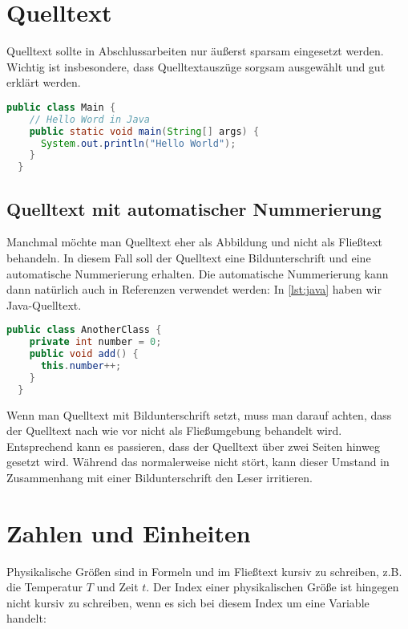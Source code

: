 \section{Quelltext}

Quelltext sollte in Abschlussarbeiten nur äußerst sparsam eingesetzt werden. Wichtig ist insbesondere, dass Quelltextauszüge sorgsam ausgewählt und gut erklärt werden.

\begin{lstlisting}[language=Java,gobble=2]
  public class Main {
    // Hello Word in Java
    public static void main(String[] args) {
      System.out.println("Hello World");
    }
  }
\end{lstlisting}

\subsection{Quelltext mit automatischer Nummerierung}

Manchmal möchte man Quelltext eher als Abbildung und nicht als Fließtext behandeln. In diesem Fall soll der Quelltext eine Bildunterschrift und eine automatische Nummerierung erhalten. Die automatische Nummerierung kann dann natürlich auch in Referenzen verwendet werden: In \vref{lst:java} haben wir Java-Quelltext.

\begin{lstlisting}[language=Java,gobble=2,caption={Ich bin die Bildunterschrift des Quelltextes},label=lst:java]
  public class AnotherClass {
    private int number = 0;
    public void add() {
      this.number++;
    }
  }
\end{lstlisting}

Wenn man Quelltext mit Bildunterschrift setzt, muss man darauf achten, dass der Quelltext nach wie vor nicht als Fließumgebung behandelt wird. Entsprechend kann es passieren, dass der Quelltext über zwei Seiten hinweg gesetzt wird. Während das normalerweise nicht stört, kann dieser Umstand in Zusammenhang mit einer Bildunterschrift den Leser irritieren.

\section{Zahlen und Einheiten}

Physikalische Größen sind in Formeln und im Fließtext kursiv zu schreiben, z.B. die Temperatur $T$ und Zeit $t$. Der Index einer physikalischen Größe ist hingegen nicht kursiv zu schreiben, wenn es sich bei diesem Index um eine Variable handelt:

